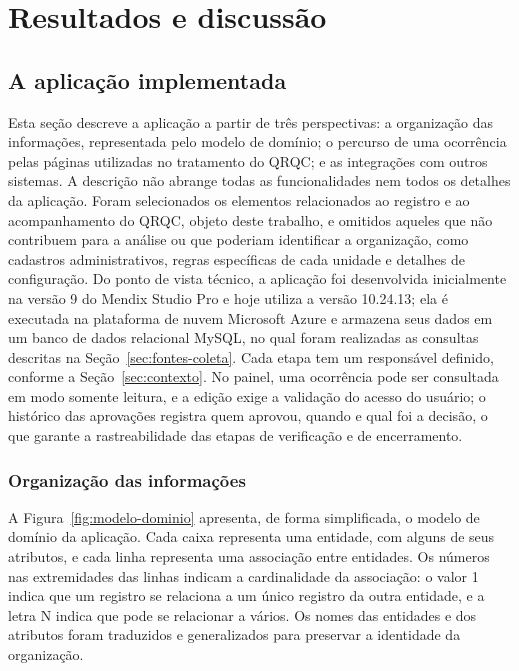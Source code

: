 \chapter{Resultados e discussão}
\label{cap:resultados}

\section{A aplicação implementada}
\label{sec:aplicacao-implementada}

Esta seção descreve a aplicação a partir de três perspectivas: a organização das informações, representada pelo modelo de domínio; o percurso de uma ocorrência pelas páginas utilizadas no tratamento do QRQC; e as integrações com outros sistemas. A descrição não abrange todas as funcionalidades nem todos os detalhes da aplicação. Foram selecionados os elementos relacionados ao registro e ao acompanhamento do QRQC, objeto deste trabalho, e omitidos aqueles que não contribuem para a análise ou que poderiam identificar a organização, como cadastros administrativos, regras específicas de cada unidade e detalhes de configuração. Do ponto de vista técnico, a aplicação foi desenvolvida inicialmente na versão 9 do Mendix Studio Pro e hoje utiliza a versão 10.24.13; ela é executada na plataforma de nuvem Microsoft Azure e armazena seus dados em um banco de dados relacional MySQL, no qual foram realizadas as consultas descritas na Seção~\ref{sec:fontes-coleta}. Cada etapa tem um responsável definido, conforme a Seção~\ref{sec:contexto}. No painel, uma ocorrência pode ser consultada em modo somente leitura, e a edição exige a validação do acesso do usuário; o histórico das aprovações registra quem aprovou, quando e qual foi a decisão, o que garante a rastreabilidade das etapas de verificação e de encerramento.

\subsection{Organização das informações}
\label{subsec:modelo-dominio}

A Figura~\ref{fig:modelo-dominio} apresenta, de forma simplificada, o modelo de domínio da aplicação. Cada caixa representa uma entidade, com alguns de seus atributos, e cada linha representa uma associação entre entidades. Os números nas extremidades das linhas indicam a cardinalidade da associação: o valor 1 indica que um registro se relaciona a um único registro da outra entidade, e a letra N indica que pode se relacionar a vários. Os nomes das entidades e dos atributos foram traduzidos e generalizados para preservar a identidade da organização.

